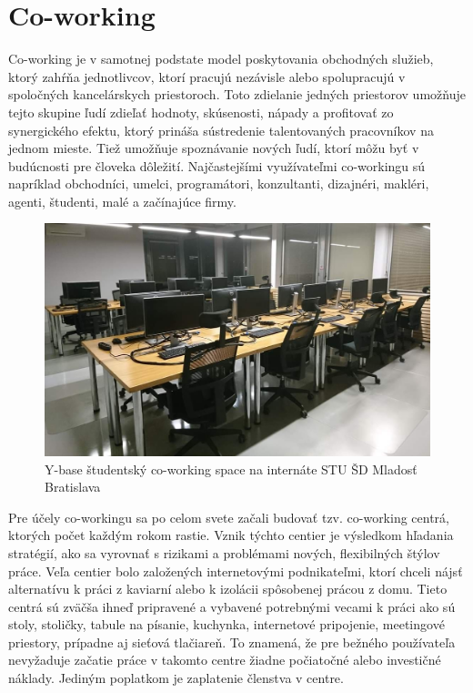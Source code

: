 \section{Co-working}
\indent Co-working je v samotnej podstate model poskytovania obchodných služieb, ktorý zahŕňa jednotlivcov, ktorí pracujú nezávisle alebo spolupracujú v spoločných kancelárskych priestoroch. Toto zdielanie jedných priestorov umožňuje tejto skupine ľudí zdieľať hodnoty, skúsenosti, nápady a profitovať zo synergického efektu, ktorý prináša sústredenie talentovaných pracovníkov na jednom mieste. Tiež umožňuje spoznávanie nových ľudí, ktorí môžu byť v budúcnosti pre človeka dôležití. Najčastejšími využívateľmi co-workingu sú napríklad obchodníci, umelci, programátori, konzultanti, dizajnéri, makléri, agenti, študenti, malé a začínajúce firmy\cite{co_working,co_working_2,co_working_3,co_working_4}.

\begin{figure}[H]
    \centering
    \includegraphics[scale=0.40]{img/ybase.jpg}
    \caption{Y-base študentský co-working space na internáte STU ŠD Mladosť Bratislava}
    \label{fig:img-ybase}
\end{figure}

\indent Pre účely co-workingu sa po celom svete začali budovať tzv. co-working centrá, ktorých počet každým rokom rastie. Vznik týchto centier je výsledkom hľadania stratégií, ako sa vyrovnať s rizikami a problémami nových, flexibilných štýlov práce. Veľa centier bolo založených internetovými podnikateľmi, ktorí chceli nájsť alternatívu k práci z kaviarní alebo k izolácii spôsobenej prácou z domu. Tieto centrá sú zväčša ihneď pripravené a vybavené potrebnými vecami k práci ako sú stoly, stoličky, tabule na písanie, kuchynka, internetové pripojenie, meetingové priestory, prípadne aj sieťová tlačiareň. To znamená, že pre bežného používateľa nevyžaduje začatie práce v takomto centre žiadne počiatočné alebo investičné náklady. Jediným poplatkom je zaplatenie členstva v centre\cite{co_working,co_working_2,co_working_3,co_working_4}. 

